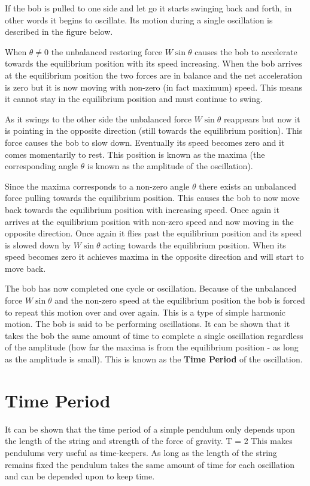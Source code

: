    If the bob is pulled to one side and let go it starts swinging back and forth, in other words it begins to oscillate. Its motion during a single oscillation is described in the figure below.

   

   When $\theta \neq 0$ the unbalanced restoring force $W \sin \theta$ causes the bob to accelerate towards the equilibrium position with its speed increasing. When the bob arrives at the equilibrium position the two forces are in balance and the net acceleration is zero but it is now moving with non-zero (in fact maximum) speed. This means it cannot stay in the equilibrium position and must continue to swing.

   As it swings to the other side the unbalanced force $W \sin \theta$ reappears but now it is pointing in the opposite direction (still towards the equilibrium position). This force causes the bob to slow down. Eventually its speed becomes zero and it comes momentarily to rest. This position is known as the maxima (the corresponding angle $\theta$ is known as the amplitude of the oscillation).

   Since the maxima corresponds to a non-zero angle $\theta$ there exists an unbalanced force pulling towards the equilibrium position. This causes the bob to now move back towards the equilibrium position with increasing speed. Once again it arrives at the equilibrium position with non-zero speed and now moving in the opposite direction. Once again it flies past the equilibrium position and its speed is slowed down by $W \sin \theta$ acting towards the equilibrium position. When its speed becomes zero it achieves maxima in the opposite direction and will start to move back.

   The bob has now completed one cycle or oscillation. Because of the unbalanced force $W \sin \theta$ and the non-zero speed at the equilibrium position the bob is forced to repeat this motion over and over again. This is a type of simple harmonic motion. The bob is said to be performing oscillations. It can be shown that it takes the bob the same amount of time to complete a single oscillation regardless of the amplitude (how far the maxima is from the equilibrium position - as long as the amplitude is small). This is known as the \textbf{Time Period} of the oscillation.

\section{Time Period}

   It can be shown that the time period of a simple pendulum only depends upon the length of the string and strength of the force of gravity.
   \beq
      T = 2 \pi {}
   \eeq
   This makes pendulums very useful as time-keepers. As long as the length of the string remains fixed the pendulum takes the same amount of time for each oscillation and can be depended upon to keep time.
